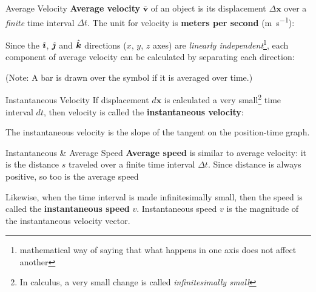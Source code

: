 \documentclass[12pt,compress,aspectratio=169]{beamer}
\newcommand{\iii}{\ensuremath\hat{\bm{\imath}}}
\newcommand{\jjj}{\ensuremath\hat{\bm{\jmath}}}
\newcommand{\kkk}{\ensuremath\hat{\bm{k}}}
\begin{document}
\begin{frame}{Average Velocity}
  \textbf{Average velocity} $\overline{\bm{v}}$ of an object is its
  displacement $\Delta\bm{x}$ over a \emph{finite} time interval $\Delta t$.
  The unit for velocity is \textbf{meters per second} (\si{\metre\per\second}):

  
  Since the $\iii$, $\jjj$ and $\kkk$ directions ($x$, $y$, $z$ axes) are
  \emph{linearly independent}\footnote{mathematical way of saying that what happens in
  one axis does not affect another}, each component of average velocity can be
  calculated by separating each direction:

  \eq{-.2in}{
    \boxed{
      \overline{\bm{v}}=
      \frac{\Delta x}{\Delta t}\iii + \frac{\Delta y}{\Delta t}\jjj +
      \frac{\Delta z}{\Delta t}\kkk
    }
  }

  (Note: A bar is drawn over the symbol if it is averaged over time.)
  \vspace{.15in}
\end{frame}



\begin{frame}{Instantaneous Velocity}
  If displacement $d\bm{x}$ is calculated a very small\footnote{In
    calculus, a very small change is called \emph{infinitesimally small}} time
  interval $dt$, then velocity is called the \textbf{instantaneous velocity}:
  
  
  The instantaneous velocity is the slope of the tangent on the position-time graph.
\end{frame}



\begin{frame}{Instantaneous \& Average Speed}
  \textbf{Average speed} is similar to average velocity: it is the distance $s$
  traveled over a finite time interval $\Delta t$. Since distance is always
  positive, so too is the average speed
 

  Likewise, when the time interval is made infinitesimally small, then the speed is
  called the \textbf{instantaneous speed} $v$. Instantaneous speed $v$ is the
  magnitude of the instantaneous velocity vector.
\end{frame}
\end{document}
